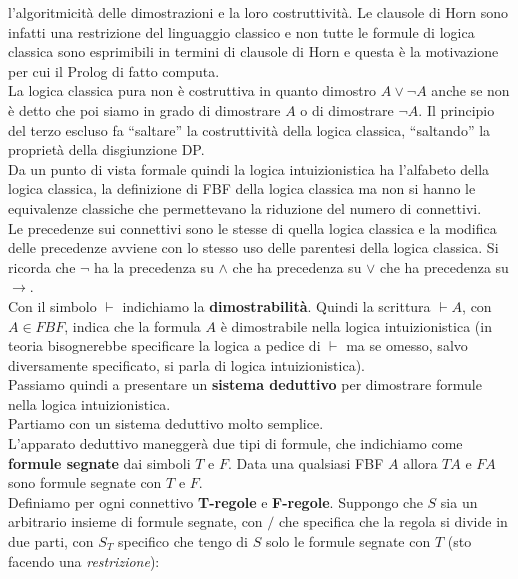 \documentclass[a4paper,12pt, oneside]{book}
\begin{document}
l'algoritmicità delle dimostrazioni e la loro costruttività. Le clausole di Horn
sono infatti una restrizione del linguaggio classico e non tutte le formule di
logica classica sono esprimibili in termini di clausole di Horn e questa è la
motivazione per cui il Prolog di fatto computa.\\
La logica classica pura non è costruttiva in quanto dimostro $A\lor \neg A$
anche se non è detto che poi siamo in grado di dimostrare $A$ o di dimostrare
$\neg A$. Il principio del terzo escluso fa ``saltare'' la costruttività della
logica classica, ``saltando'' la proprietà della disgiunzione DP.\\
Da un punto di vista formale quindi la logica intuizionistica ha l'alfabeto
della logica classica, la definizione di FBF della logica classica ma non si
hanno le equivalenze classiche che permettevano la riduzione del numero di
connettivi.\\ 
Le precedenze sui connettivi sono le stesse di quella logica classica e la
modifica delle precedenze avviene con lo stesso uso delle parentesi della logica
classica. Si ricorda che $\neg$ ha la precedenza su $\land$ che ha precedenza su
$\lor$ che ha precedenza su $\to$.\\
Con il simbolo $\vdash$ indichiamo la \textbf{dimostrabilità}. Quindi la
scrittura $\vdash A$, con $A\in FBF$, indica che la formula $A$ è dimostrabile
nella logica intuizionistica (in teoria bisognerebbe specificare la logica
a pedice di $\vdash$ ma se omesso, salvo diversamente specificato, si parla di
logica intuizionistica).\\
Passiamo quindi a presentare un \textbf{sistema deduttivo} per dimostrare
formule nella logica intuizionistica.\\
Partiamo con un sistema deduttivo molto semplice.\\
L'apparato deduttivo maneggerà due tipi di formule, che indichiamo come
\textbf{formule segnate} dai simboli $T$ e $F$. Data una qualsiasi FBF $A$
allora $TA$ e $FA$ sono formule segnate con $T$ e $F$.\\
Definiamo per ogni connettivo \textbf{T-regole} e \textbf{F-regole}. Suppongo
che $S$ sia un arbitrario insieme di formule segnate, con $/$ che specifica che
la regola si divide in due parti, con $S_T$ specifico che tengo di $S$ solo le
formule segnate con $T$ (sto facendo una \textit{restrizione}):
\end{document}

